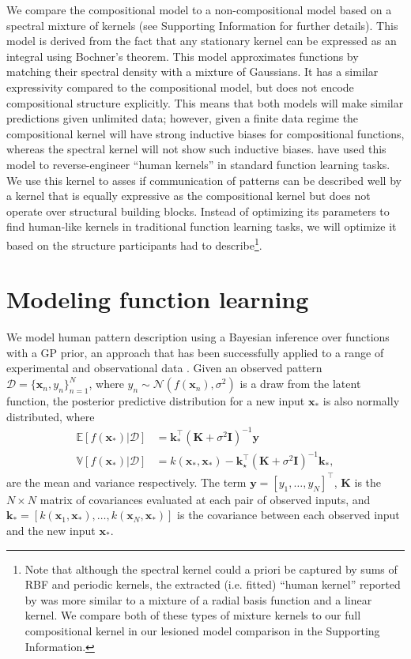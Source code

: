 \documentclass[a4paper,man, floatsintext, natbib]{apa6}
\begin{document}
We compare the compositional model to a non-compositional model based on a spectral mixture of kernels (see Supporting Information for further details). This model is derived from the fact that any stationary kernel can be expressed as an integral using Bochner's theorem. This model approximates functions by matching their spectral density with a mixture of Gaussians. It has a similar expressivity compared to the compositional model, but does not encode compositional structure explicitly. This means that both models will make similar predictions given unlimited data; however, given a finite data regime the compositional kernel will have strong inductive biases for compositional functions, whereas the spectral kernel will not show such inductive biases. \cite{wilson2015human} have used this model to reverse-engineer ``human kernels'' in standard function learning tasks. We use this kernel to asses if communication of patterns can be described well by a kernel that is equally expressive as the compositional kernel but does not operate over structural building blocks. Instead of optimizing its parameters to find human-like kernels in traditional function learning tasks, we will optimize it based on the structure participants had to describe\footnote{Note that although the spectral kernel could a priori be captured by sums of RBF and periodic kernels, the extracted (i.e. fitted) ``human kernel'' reported by \cite{wilson2015human} was more similar to a mixture of a radial basis function and a linear kernel. We compare both of these types of mixture kernels to our full compositional kernel in our lesioned model comparison in the Supporting Information.}.

\section{Modeling function learning}

We model human pattern description using a Bayesian inference over functions with a GP prior, an approach that has been successfully applied to a range of experimental and observational data \citep{griffiths2009modeling, lucas2015rational,Schulz2019Structured, wu2017exploration}. Given an observed pattern $\mathcal{D}=\{\mathbf{x}_n, y_n\}_{n=1}^N$, where $y_n \sim \mathcal{N}(f(\mathbf{x}_n),\sigma^2)$ is a draw from the latent function, the posterior predictive distribution for a new input $\mathbf{x}_\ast$ is also normally distributed, where
\begin{align}
\mathbb{E}[f(\mathbf{x}_\ast)|\mathcal{D}]&=\mathbf{k}_\ast^\top (\mathbf{K}+\sigma^2\mathbf{I})^{-1}\mathbf{y} \\
\mathbb{V}[f(\mathbf{x}_\ast)|\mathcal{D}]&=k(\mathbf{x}_\ast,\mathbf{x}_\ast)-\mathbf{k}_\star^\top(\mathbf{K}+\sigma^2\mathbf{I})^{-1}\mathbf{k}_\ast,
\end{align}
are the mean and variance respectively. The term $\mathbf{y} = [y_1,\ldots,y_N]^\top$, $\mathbf{K}$ is the $N \times N$ matrix of covariances evaluated at each pair of observed inputs, and $\mathbf{k}_\ast = [k(\mathbf{x}_1,\mathbf{x}_\ast),\ldots,k(\mathbf{x}_N,\mathbf{x}_\ast)]$ is the covariance between each observed input and the new input $\mathbf{x}_\ast$.
\end{document}
